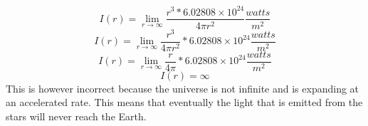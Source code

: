 \documentclass{article}
\theoremstyle{plain}
\begin{document}
\begin{enumerate}
\begin{enumerate}[label=(\alph*)]
                    \begin{equation*}
                        I(r) = \lim_{r \rightarrow \infty}  \frac{r^3 * 6.02808 \times 10^{24}}{4\pi r^2} \frac{watts}{m^2}
                    \end{equation*}
                    \begin{equation*}
                        I(r) = \lim_{r \rightarrow \infty}  \frac{r^3}{4\pi r^2} * 6.02808 \times 10^{24} \frac{watts}{m^2}
                    \end{equation*}
                    \begin{equation*}
                        I(r) = \lim_{r \rightarrow \infty}  \frac{r}{4\pi} * 6.02808 \times 10^{24} \frac{watts}{m^2}
                    \end{equation*}
                    \begin{equation*}
                        I(r) = \infty
                    \end{equation*}
                    This is however incorrect because the universe is not infinite and is expanding at an accelerated rate. This means that eventually the light that is emitted from the stars will never reach the Earth.



\end{enumerate}
\end{enumerate}
\end{document}

